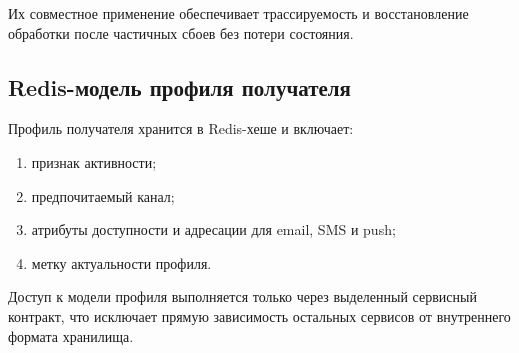 Их совместное применение обеспечивает трассируемость и восстановление обработки
после частичных сбоев без потери состояния.

\subsection{Redis-модель профиля получателя}

Профиль получателя хранится в Redis-хеше и включает:
\begin{enumerate}
    \item признак активности;
    \item предпочитаемый канал;
    \item атрибуты доступности и адресации для email, SMS и push;
    \item метку актуальности профиля.
\end{enumerate}

Доступ к модели профиля выполняется только через выделенный сервисный контракт,
что исключает прямую зависимость остальных сервисов от внутреннего формата
хранилища.
